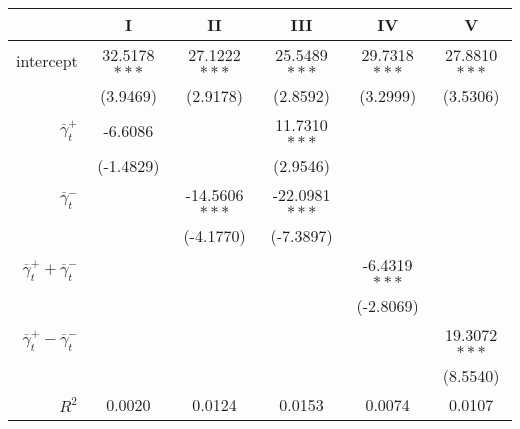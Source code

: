 \begin{tabular}{rSSSSS}
\toprule
{} &             I &             II &            III &            IV &             V \\
\midrule
intercept &  32.5178$***$ &   27.1222$***$ &   25.5489$***$ &  29.7318$***$ &  27.8810$***$ \\
          &      (3.9469) &       (2.9178) &       (2.8592) &      (3.2999) &      (3.5306) \\
$\overline \gamma^+_t$       &       -6.6086 &                &   11.7310$***$ &               &               \\
          &     (-1.4829) &                &       (2.9546) &               &               \\
$\overline \gamma^-_t$       &               &  -14.5606$***$ &  -22.0981$***$ &               &               \\
          &               &      (-4.1770) &      (-7.3897) &               &               \\
$\overline \gamma^+_t + \overline \gamma^-_t$   &               &                &                &  -6.4319$***$ &               \\
          &               &                &                &     (-2.8069) &               \\
$\overline \gamma^+_t - \overline \gamma^-_t$  &               &                &                &               &  19.3072$***$ \\
          &               &                &                &               &      (8.5540) \\
\midrule
$R^2$ & 0.0020 & 0.0124 & 0.0153 & 0.0074 & 0.0107\\\bottomrule
\end{tabular}
